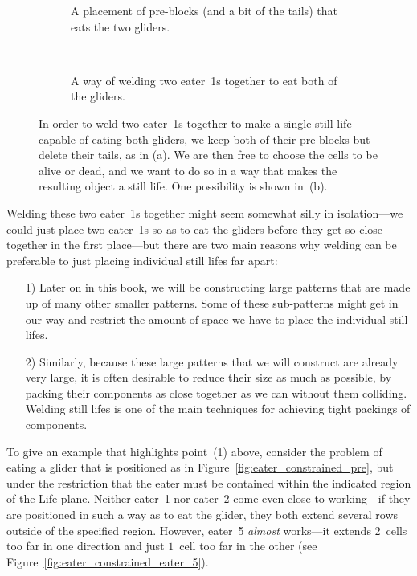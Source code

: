 \begin{figure}[!ht]
	\centering
	\begin{subfigure}{.4\textwidth}
		\centering
		\caption{A placement of pre-blocks (and a bit of the tails) that eats the two gliders.}
		\label{fig:welded_eater_1s_inc}
	\end{subfigure} \quad \ %
	\begin{subfigure}{.54\textwidth}
		\centering
		\caption{A way of welding two eater~1s together to eat both of the gliders.}
		\label{fig:welded_eater_1s}
	\end{subfigure}
	\caption{In order to weld two eater~1s together to make a single still life capable of eating both gliders, we keep both of their pre-blocks but delete their tails, as in (a). We are then free to choose the  cells to be alive or dead, and we want to do so in a way that makes the resulting object a still life. One possibility is shown in~(b).}\label{fig:welded_eater_1s_both}
\end{figure}

Welding these two eater~1s together might seem somewhat silly in isolation---we could just place two eater~1s so as to eat the gliders before they get so close together in the first place---but there are two main reasons why welding can be preferable to just placing individual still lifes far apart:\medskip

\begin{enumerate}
	\item[1)] Later on in this book, we will be constructing large patterns that are made up of many other smaller patterns. Some of these sub-patterns might get in our way and restrict the amount of space we have to place the individual still lifes.\smallskip
	
	\item[2)] Similarly, because these large patterns that we will construct are already very large, it is often desirable to reduce their size as much as possible, by packing their components as close together as we can without them colliding. Welding still lifes is one of the main techniques for achieving tight packings of components.\medskip
\end{enumerate}

To give an example that highlights point~(1) above, consider the problem of eating a glider that is positioned as in Figure~\ref{fig:eater_constrained_pre}, but under the restriction that the eater must be contained within the indicated region of the Life plane. Neither eater~1 nor eater~2 come even close to working---if they are positioned in such a way as to eat the glider, they both extend several rows outside of the specified region. However, eater~5 \emph{almost} works---it extends $2$~cells too far in one direction and just $1$~cell too far in the other (see Figure~\ref{fig:eater_constrained_eater_5}).

